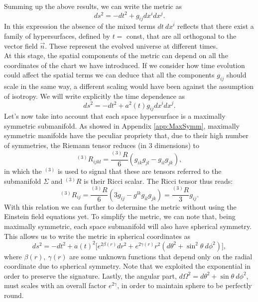 Summing up the above results, we can write the metric as
\begin{equation*}
    ds^2=-dt^2+g_{ij}dx^i dx^j.
\end{equation*}
In this expression the absence of the mixed terms $dt\ dx^i$ reflects that there exist a family of hypersurfaces, defined by $t=$ const, that are all orthogonal to the vector field $\vec n$. These represent the evolved universe at different times.\\
At this stage, the spatial components of the metric can depend on all the coordinates of the chart we have introduced. If we consider how time evolution could affect the spatial terms we can deduce that all the components $g_{ij}$ should scale in the same way, a different scaling would have been against the assumption of isotropy. We will write explicitly the time dependence as
\begin{equation*}
    ds^2=-dt^2+a^2(t)g_{ij}dx^i dx^j.
\end{equation*} 
Let's now take into account that each space hypersurface is a maximally symmetric submanifold. 
As showed in Appendix \ref{app:MaxSymm}, maximally symmetric manifolds have the peculiar propriety that, due to their high number of symmetries, the Riemann tensor reduces (in 3 dimensions) to 
\begin{equation*}
    ^{(3)}R_{ijkl}=\frac{^{(3)}R}{6}(g_{ik}g_{jl}-g_{il}g_{jk}),
\end{equation*}
in which the $^{(3)}$ is used to signal that these are tensors referred to the submanifold $\Sigma$ and $^{(3)}R$ is their Ricci scalar. The Ricci tensor thus reads:
\begin{equation}\label{maxsymRicci}
    ^{(3)}R_{ij}=\frac{^{(3)}R}{6}(3g_{ij}-g^{lk}g_{il}g_{jk})=\frac{^{(3)}R}{3}g_{ij}.
\end{equation}
With this relation we can further to determine the metric without using the Einstein field equations yet.
To simplify the metric, we can note that, being maximally symmetric, each space submanifold will also have spherical symmetry. This allows us to write the metric in spherical coordinates as
\begin{equation*}
    ds^2=-dt^2+a(t)^2\big[e^{2\beta(r)}dr^2+e^{2\gamma(r)}r^2(d\theta^2+\sin^2\theta\ d\phi^2)\big],
\end{equation*}  
where $\beta(r),\ \gamma(r)$ are some unknown functions that depend only on the radial coordinate due to spherical symmetry. Note that we exploited the exponential in order to preserve the signature. Lastly, the angular part, $d\Omega^2= d\theta^2+\sin\theta\ d\phi^2$, must scales with an overall factor $e^{2\gamma}$, in order to maintain sphere to be perfectly round.\\
